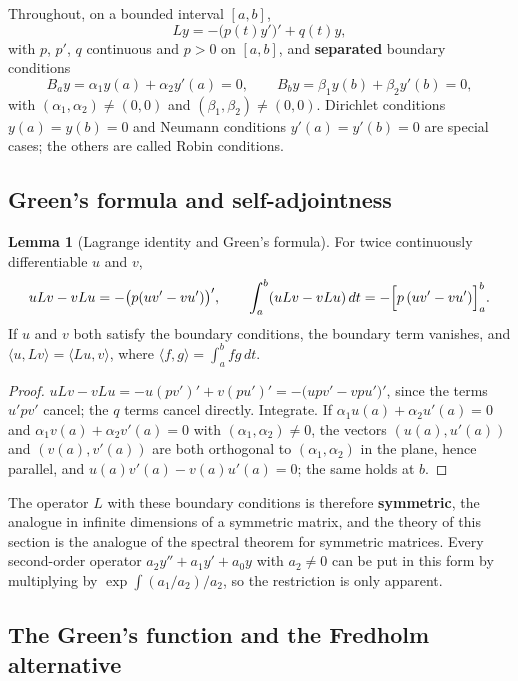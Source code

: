 \documentclass[11pt,a4paper]{article}
\numberwithin{equation}{section}
\theoremstyle{definition}
\newtheorem{lem}[thm]{Lemma}
\begin{document}
Throughout, on a bounded interval $[a, b]$,
\[
Ly = -\bigl(p(t)y'\bigr)' + q(t)y ,
\]
with $p$, $p'$, $q$ continuous and $p > 0$ on $[a, b]$, and \textbf{separated} boundary conditions
\[
B_ay = \alpha_1y(a) + \alpha_2y'(a) = 0, \qquad B_by = \beta_1y(b) + \beta_2y'(b) = 0 ,
\]
with $(\alpha_1, \alpha_2) \neq (0, 0)$ and $(\beta_1, \beta_2) \neq (0, 0)$. Dirichlet conditions $y(a) = y(b) = 0$ and Neumann conditions $y'(a) = y'(b) = 0$ are special cases; the others are called Robin conditions.

\subsection{Green's formula and self-adjointness}
\label{ssec:green}

\begin{lem}[Lagrange identity and Green's formula]
\label{lem:lagrange}
For twice continuously differentiable $u$ and $v$,
\[
uLv - vLu = -\bigl(p(uv' - vu')\bigr)', \qquad \int_a^b(uLv - vLu)\,dt = -\Bigl[p\,(uv' - vu')\Bigr]_a^b .
\]
If $u$ and $v$ both satisfy the boundary conditions, the boundary term vanishes, and $\langle u, Lv\rangle = \langle Lu, v\rangle$, where $\langle f, g\rangle = \int_a^bfg\,dt$.
\end{lem}

\begin{proof}
$uLv - vLu = -u(pv')' + v(pu')' = -\bigl(upv' - vpu'\bigr)'$, since the terms $u'pv'$ cancel; the $q$ terms cancel directly. Integrate. If $\alpha_1u(a) + \alpha_2u'(a) = 0$ and $\alpha_1v(a) + \alpha_2v'(a) = 0$
with $(\alpha_1, \alpha_2) \neq 0$, the vectors $(u(a), u'(a))$ and $(v(a), v'(a))$ are both orthogonal to $(\alpha_1, \alpha_2)$ in the plane, hence parallel, and $u(a)v'(a) - v(a)u'(a) = 0$; the same holds at $b$.
\end{proof}

The operator $L$ with these boundary conditions is therefore \textbf{symmetric}, the analogue in infinite dimensions of a symmetric matrix, and the theory of this section is the analogue of the
spectral theorem for symmetric matrices. Every second-order operator $a_2y'' + a_1y' + a_0y$ with $a_2 \neq 0$ can be put in this form by multiplying by $\exp\int(a_1/a_2)/a_2$, so the restriction is
only apparent.

\subsection{The Green's function and the Fredholm alternative}
\label{ssec:greenbvp}
\end{document}
